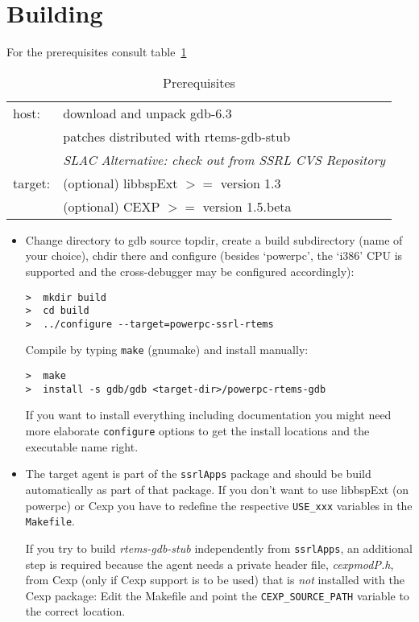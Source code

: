 \documentclass{article}
\begin{document}
\section{Building}
For the prerequisites consult table~\ref{tbl:prereq}
\begin{table}
\begin{center}
\begin{tabular}{ll}
host: & download and unpack gdb-6.3\\
      & patches distributed with rtems-gdb-stub\\
      & {\em SLAC Alternative: check out from SSRL CVS Repository}\\
target: & (optional) libbspExt $>=$ version 1.3\\
        & (optional) CEXP $>=$ version 1.5.beta
\end{tabular}
\caption{Prerequisites}
\label{tbl:prereq}
\end{center}
\end{table}

\begin{itemize}
\item
  Change directory to gdb source topdir, create a build
  subdirectory (name of your choice), chdir there and configure
  (besides `powerpc', the `i386' CPU is supported and the
  cross-debugger may be configured accordingly):
\begin{verbatim}
>  mkdir build
>  cd build
>  ../configure --target=powerpc-ssrl-rtems  
\end{verbatim}

  Compile by typing {\tt make} (gnumake) and install manually:
\begin{verbatim}
>  make
>  install -s gdb/gdb <target-dir>/powerpc-rtems-gdb
\end{verbatim}

  If you want to install everything including documentation you
  might need more elaborate {\tt configure} options to get the
  install locations and the executable name right.
  
\item
  The target agent is part of the {\tt ssrlApps} package and
  should be build automatically as part of that package.
  If you don't want to use libbspExt (on powerpc) or Cexp
  you have to redefine the respective {\tt USE\_xxx} variables
  in the {\tt Makefile}.

  If you try to build {\em rtems-gdb-stub} independently from
  {\tt ssrlApps}, an additional step is required because
  the agent needs a private header file, {\em cexpmodP.h},
  from Cexp (only if Cexp support is to be used) that is {\em not}
  installed with the Cexp package: Edit the Makefile
  and point the {\tt CEXP\_SOURCE\_PATH} variable to the
  correct location.
\end{itemize}
\end{document}
